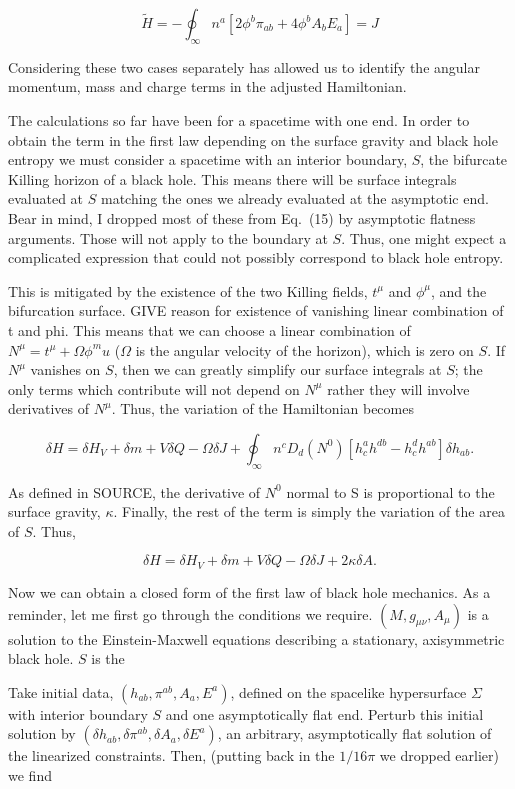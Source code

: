 \documentclass[titlepage]{article}
\def\beq{\begin{equation}}
\def\eeq{\end{equation}}
\begin{document}
\beq
\tilde{H} = -\oint_{\infty}n^a \left[2 \phi^b  \pi_{ab} + 4 \phi^b A_b E_a \right] = J
\eeq

\noindent
Considering these two cases separately has allowed us to identify the angular momentum, mass and charge terms in the adjusted Hamiltonian.

The calculations so far have been for a spacetime with one end. In order to obtain the term in the first law depending on the surface gravity and black hole entropy we must consider a spacetime with an interior boundary, $S$, the bifurcate Killing horizon of a black hole.  This means there will be surface integrals evaluated at $S$ matching the ones we already evaluated at the asymptotic end.  Bear in mind, I dropped most of these from Eq.\ (15) by asymptotic flatness arguments.  Those will not apply to the boundary at $S$.  Thus, one might expect a complicated expression that could not possibly correspond to black hole entropy. 

This is mitigated by the existence of the two Killing fields, $t^\mu$ and $\phi^\mu$, and the bifurcation surface.  GIVE reason for existence of vanishing linear combination of t and phi.  This means that we can choose a linear combination of $N^\mu=t^\mu + \Omega \phi^mu$ ($\Omega$ is the angular velocity of the horizon), which is zero on $S$.  If $N^\mu$ vanishes on $S$, then we can greatly simplify our surface integrals at $S$; the only terms which contribute will not depend on $N^\mu$ rather they will involve derivatives of $N^\mu$. Thus, the variation of the Hamiltonian becomes

\beq
\delta H = \delta H_V + \delta m + V\delta Q - \Omega \delta J +\oint_\infty n^c  D_d \left(N^0\right) \left[ h_c^ah^{db}-h_c^dh^{ab} \right] \delta h_{ab}.
\eeq

\noindent
As defined in SOURCE, the derivative of $N^0$ normal to S is proportional to the surface gravity, $\kappa$.  Finally, the rest of the term is simply the variation of the area of $S$.  Thus,

\beq
\delta H = \delta H_V + \delta m + V\delta Q - \Omega \delta J + 2\kappa \delta A.
\eeq


Now we can obtain a closed form of the first law of black hole mechanics.  As a reminder, let me first go through the conditions we require.  $(M,g_{\mu\nu},A_\mu)$ is a solution to the Einstein-Maxwell equations describing a stationary, axisymmetric black hole.  $S$ is the 

Take initial data, $( h_{ab},\pi^{ab}, A_a, E^a)$, defined on the spacelike hypersurface $\Sigma$ with interior boundary $S$ and one asymptotically flat end.  Perturb this initial solution by $(\delta h_{ab},\delta\pi^{ab},\delta A_a,\delta E^a)$, an arbitrary, asymptotically flat solution of the linearized constraints.  Then, (putting back in the $1/16\pi$ we dropped earlier) we find 
\end{document}
